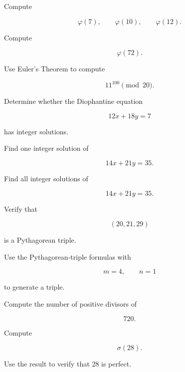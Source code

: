 \begin{exercise}[1]
Compute

\[ \varphi(7),\qquad\varphi(10),\qquad\varphi(12). \]
\end{exercise}

\begin{exercise}[2]
Compute

\[ \varphi(72). \]
\end{exercise}

\begin{exercise}[2]
Use Euler's Theorem to compute

\[ 11^{100}\pmod{20}. \]
\end{exercise}

\begin{exercise}[2]
Determine whether the Diophantine equation

\[ 12x+18y=7 \]

has integer solutions.
\end{exercise}

\begin{exercise}[2]
Find one integer solution of

\[ 14x+21y=35. \]
\end{exercise}

\begin{exercise}[3]
Find all integer solutions of

\[ 14x+21y=35. \]
\end{exercise}

\begin{exercise}[2]
Verify that

\[ (20,21,29) \]

is a Pythagorean triple.
\end{exercise}

\begin{exercise}[2]
Use the Pythagorean-triple formulas with

\[ m=4,\qquad n=1 \]

to generate a triple.
\end{exercise}

\begin{exercise}[2]
Compute the number of positive divisors of

\[ 720. \]
\end{exercise}

\begin{exercise}[2]
Compute

\[ \sigma(28). \]

Use the result to verify that \(28\) is perfect.
\end{exercise}

